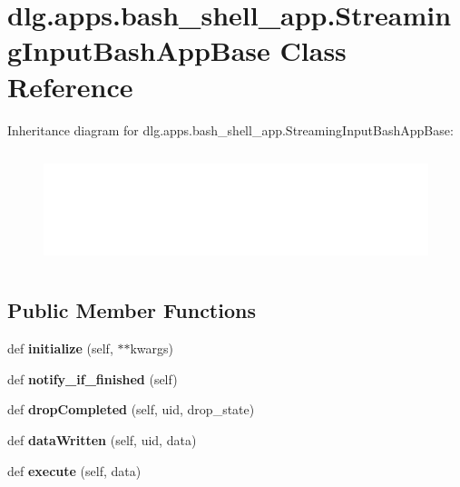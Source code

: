 \hypertarget{classdlg_1_1apps_1_1bash__shell__app_1_1_streaming_input_bash_app_base}{}\section{dlg.\+apps.\+bash\+\_\+shell\+\_\+app.\+Streaming\+Input\+Bash\+App\+Base Class Reference}
\label{classdlg_1_1apps_1_1bash__shell__app_1_1_streaming_input_bash_app_base}
Inheritance diagram for dlg.\+apps.\+bash\+\_\+shell\+\_\+app.\+Streaming\+Input\+Bash\+App\+Base\+:\begin{figure}[H]
\begin{center}
\leavevmode
\includegraphics[height=3.343284cm]{classdlg_1_1apps_1_1bash__shell__app_1_1_streaming_input_bash_app_base}
\end{center}
\end{figure}
\subsection*{Public Member Functions}
\begin{DoxyCompactItemize}
\item 
\mbox{\label{classdlg_1_1apps_1_1bash__shell__app_1_1_streaming_input_bash_app_base_aed7816f2ef1699fb19b2a51d8c371d4d}} 
def {\bfseries initialize} (self, $\ast$$\ast$kwargs)
\item 
\mbox{\label{classdlg_1_1apps_1_1bash__shell__app_1_1_streaming_input_bash_app_base_a3b558c0ca24d94d979ac37b44a1cb2ef}} 
def {\bfseries notify\+\_\+if\+\_\+finished} (self)
\item 
\mbox{\label{classdlg_1_1apps_1_1bash__shell__app_1_1_streaming_input_bash_app_base_a8a0232ce9a050de2317327acdb10eb13}} 
def {\bfseries drop\+Completed} (self, uid, drop\+\_\+state)
\item 
\mbox{\label{classdlg_1_1apps_1_1bash__shell__app_1_1_streaming_input_bash_app_base_a3683b007ce4f7e99175acdfa3a00074f}} 
def {\bfseries data\+Written} (self, uid, data)
\item 
\mbox{\label{classdlg_1_1apps_1_1bash__shell__app_1_1_streaming_input_bash_app_base_aebab4fcc13d7b18656ec358fa29c5c5d}} 
def {\bfseries execute} (self, data)
\end{DoxyCompactItemize}
